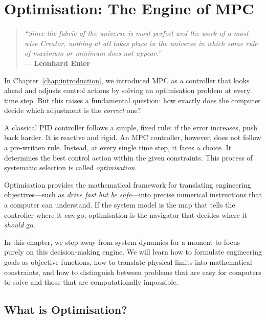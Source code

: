 
\chapter{Optimisation: The Engine of MPC}
\label{chap:optimisation}

\begin{quote}
	\textit{``Since the fabric of the universe is most perfect and the work of a most wise Creator, nothing at all takes place in the universe in which some rule of maximum or minimum does not appear.''} \\
	
	\hfill --- \textbf{Leonhard Euler}
\end{quote}


In Chapter~\ref{chap:introduction}, we introduced MPC as a controller that looks ahead and adjusts control actions by solving an optimisation problem at every time step. But this raises a fundamental question: how exactly does the computer decide which adjustment is the \emph{correct} one?

A classical PID controller follows a simple, fixed rule: if the error increases, push back harder. It is reactive and rigid. An MPC controller, however, does not follow a pre-written rule. Instead, at every single time step, it faces a choice. It determines the best control action within the given constraints. This process of systematic selection is called \emph{optimisation}.

Optimisation provides the mathematical framework for translating engineering objectives—such as \emph{drive fast but be safe}—into precise numerical instructions that a computer can understand. If the system model is the map that tells the controller where it \textit{can} go, optimisation is the navigator that decides where it \textit{should} go.

In this chapter, we step away from system dynamics for a moment to focus purely on this decision-making engine. We will learn how to formulate engineering goals as objective functions, how to translate physical limits into mathematical constraints, and how to distinguish between problems that are easy for computers to solve and those that are computationally impossible.

\section{What is Optimisation?}


